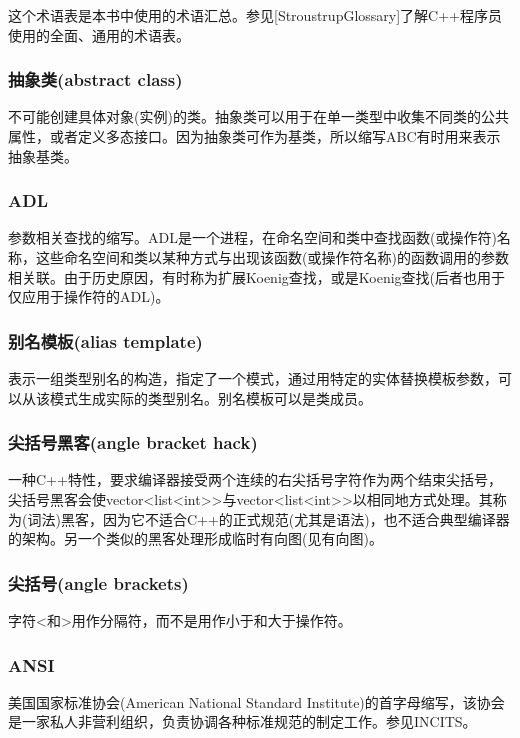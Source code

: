 
这个术语表是本书中使用的术语汇总。参见[StroustrupGlossary]了解C++程序员使用的全面、通用的术语表。

\subsubsection{抽象类(abstract class)}

不可能创建具体对象(实例)的类。抽象类可以用于在单一类型中收集不同类的公共属性，或者定义多态接口。因为抽象类可作为基类，所以缩写ABC有时用来表示抽象基类。

\subsubsection{ADL}

参数相关查找的缩写。ADL是一个进程，在命名空间和类中查找函数(或操作符)名称，这些命名空间和类以某种方式与出现该函数(或操作符名称)的函数调用的参数相关联。由于历史原因，有时称为扩展Koenig查找，或是Koenig查找(后者也用于仅应用于操作符的ADL)。

\subsubsection{别名模板(alias template)}  

表示一组类型别名的构造，指定了一个模式，通过用特定的实体替换模板参数，可以从该模式生成实际的类型别名。别名模板可以是类成员。

\subsubsection{尖括号黑客(angle bracket hack)}

一种C++特性，要求编译器接受两个连续的右尖括号字符作为两个结束尖括号，尖括号黑客会使vector<list<int>{}>与vector<list<int>{}>以相同地方式处理。其称为(词法)黑客，因为它不适合C++的正式规范(尤其是语法)，也不适合典型编译器的架构。另一个类似的黑客处理形成临时有向图(见有向图)。

\subsubsection{尖括号(angle brackets)}

字符<和>用作分隔符，而不是用作小于和大于操作符。

\subsubsection{ANSI}

美国国家标准协会(American National Standard Institute)的首字母缩写，该协会是一家私人非营利组织，负责协调各种标准规范的制定工作。参见INCITS。

